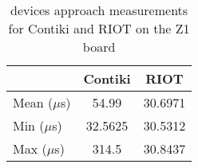 \begin{table}[!ht]
  \centering
  \begin{tabular}{l|c|c}
                & Contiki  & RIOT \\ \hline
  Mean ($\mu$s) & 54.99    & 30.6971 \\
  Min  ($\mu$s) & 32.5625  & 30.5312 \\
  Max  ($\mu$s) & 314.5    & 30.8437
  \end{tabular}
  \caption{devices approach measurements for Contiki and RIOT on the Z1 board}
  \label{tab:devices-framework-z1}
  \end{table}